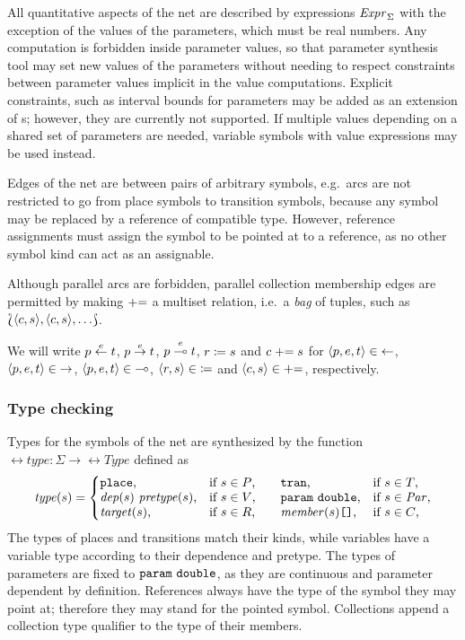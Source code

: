 All quantitative aspects of the net are described by expressions \(\textrm{\itshape Expr\/}_\Sigma\) with the exception of the values of the parameters, which must be real numbers. Any computation is forbidden inside parameter values, so that parameter synthesis tool may set new values of the parameters without needing to respect constraints between parameter values implicit in the value computations. Explicit constraints, such as interval bounds for parameters may be added as an extension of s; however, they are currently not supported. If multiple values depending on a shared set of parameters are needed, variable symbols with value expressions may be used instead.

Edges of the net are between pairs of arbitrary symbols, e.g.~arcs are not restricted to go from place symbols to transition symbols, because any symbol may be replaced by a reference of compatible type. However, reference assignments must assign the symbol to be pointed at to a reference, as no other symbol kind can act as an assignable.

Although parallel arcs are forbidden, parallel collection membership edges are permitted by making \({\mathrel{{+}{=}}}\) a multiset relation, i.e.~a \emph{bag} of tuples, such as \(\Lbag \langle c, s \rangle, \langle c, s \rangle, \ldots \Rbag\).

We will write \(p \overset{e}{\leftarrow} t\), \(p \overset{e}{\rightarrow} t\), \(p \overset{e}{\multimap} t\), \(r \coloneq s\) and \(c \mathrel{{+}{=}} s\) for \(\langle p, e, t \rangle \in {\leftarrow}\), \(\langle p, e, t \rangle \in {\rightarrow}\), \(\langle p, e, t \rangle \in {\multimap}\), \(\langle r, s \rangle \in {\coloneq}\) and \(\langle c, s \rangle \in {\mathrel{{+}{=}}}\), respectively.

\subsubsection{Type checking}

Types for the symbols of the net are synthesized by the function \(\rel{type}\colon \Sigma \to \rel{Type}\) defined as
\begin{equation}
  \rel{type}(s) = \left\{\begin{array}{@{}l@{\quad}l@{\qquad}l@{\quad}l@{}}
    \lit{place} \text, & \text{if \(s \in P\),}
    & \lit{tran} \text, & \text{if \(s \in T\),} \\
    \vartype{\rel{dep}(s)}{\rel{pretype}(s)} \text, & \text{if \(s \in V\),}
    & \vartype{\lit{param}}{\lit{double}} \text, & \text{if \(s \in \Par\),} \\
    \rel{target}(s) \text, & \text{if \(s \in R\),}
    & \bagtype{\rel{member}(s)} \text, & \text{if \(s \in C\),}
  \end{array}\right.
\end{equation}
The types of places and transitions match their kinds, while variables have a variable type according to their dependence and pretype. The types of parameters are fixed to \(\texttt{\upshape param}\ \texttt{\upshape double}\), as they are continuous and parameter dependent by definition. References always have the type of the symbol they may point at; therefore they may stand for the pointed symbol. Collections append a collection type qualifier to the type of their members.


